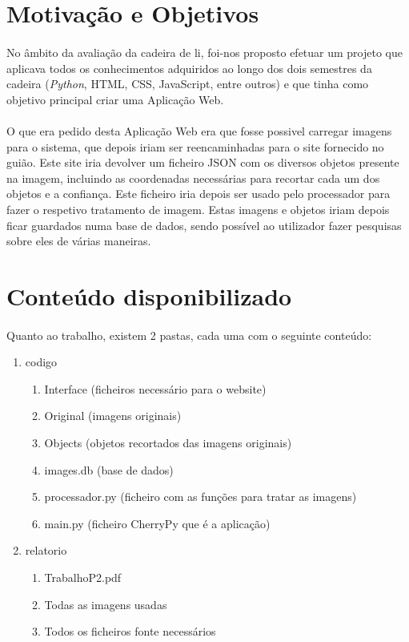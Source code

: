 \documentclass{report}
\begin{document}
\section{Motivação e Objetivos}
\paragraph{}
No âmbito da avaliação da cadeira de \acs{li}, foi-nos proposto efetuar um projeto que aplicava todos os conhecimentos adquiridos ao longo dos dois semestres da cadeira (\textit{Python}, HTML, CSS, JavaScript, entre outros) e que tinha como objetivo principal criar uma Aplicação Web.
\paragraph{}
O que era pedido desta Aplicação Web era que fosse possivel carregar imagens para o sistema, que depois iriam ser reencaminhadas para o site fornecido no guião\cite{Object_Detection}. Este site iria devolver um ficheiro JSON com os diversos objetos presente na imagem, incluindo as coordenadas necessárias para recortar cada um dos objetos e a confiança. Este ficheiro iria depois ser usado pelo processador para fazer o respetivo tratamento de imagem. Estas imagens e objetos iriam depois ficar guardados numa base de dados, sendo possível ao utilizador fazer pesquisas sobre eles de várias maneiras.

\section{Conteúdo disponibilizado}
\paragraph{}
Quanto ao trabalho, existem 2 pastas, cada uma com o seguinte conteúdo:
\begin{enumerate}
	\item codigo
    \begin{enumerate}
    	\item Interface (ficheiros necessário para o website)
    	\item Original (imagens originais)
        \item Objects (objetos recortados das imagens originais)
        \item images.db (base de dados)
        \item processador.py (ficheiro com as funções para tratar as imagens)
        \item main.py (ficheiro CherryPy que é a aplicação)
    \end{enumerate}
    \item relatorio
    \begin{enumerate}
    	\item TrabalhoP2.pdf
        \item Todas as imagens usadas
        \item Todos os ficheiros fonte necessários
    \end{enumerate}
\end{enumerate}
\end{document}
